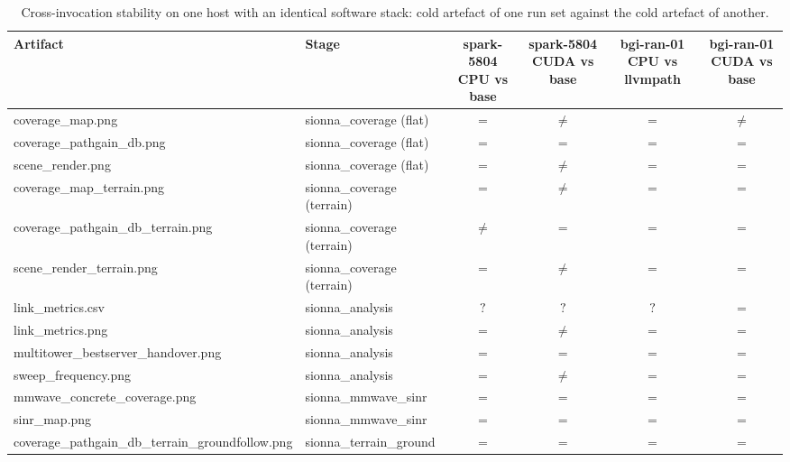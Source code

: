 \begin{table}[t]
  \centering
  \caption{Cross-invocation stability on one host with an identical software stack: cold artefact of one run set against the cold artefact of another.}
  \label{tab:replication}
  \begin{tabular}{llcccc}
    \toprule
    Artifact & Stage & spark-5804 CPU vs base & spark-5804 CUDA vs base & bgi-ran-01 CPU vs llvmpath & bgi-ran-01 CUDA vs base \\
    \midrule
    coverage\_map.png & sionna\_coverage (flat) & $=$ & $\neq$ & $=$ & $\neq$ \\
    coverage\_pathgain\_db.png & sionna\_coverage (flat) & $=$ & $=$ & $=$ & $=$ \\
    scene\_render.png & sionna\_coverage (flat) & $=$ & $\neq$ & $=$ & $=$ \\
    coverage\_map\_terrain.png & sionna\_coverage (terrain) & $=$ & $\neq$ & $=$ & $=$ \\
    coverage\_pathgain\_db\_terrain.png & sionna\_coverage (terrain) & $\neq$ & $=$ & $=$ & $=$ \\
    scene\_render\_terrain.png & sionna\_coverage (terrain) & $=$ & $\neq$ & $=$ & $=$ \\
    link\_metrics.csv & sionna\_analysis & $?$ & $?$ & $?$ & $=$ \\
    link\_metrics.png & sionna\_analysis & $=$ & $\neq$ & $=$ & $=$ \\
    multitower\_bestserver\_handover.png & sionna\_analysis & $=$ & $=$ & $=$ & $=$ \\
    sweep\_frequency.png & sionna\_analysis & $=$ & $\neq$ & $=$ & $=$ \\
    mmwave\_concrete\_coverage.png & sionna\_mmwave\_sinr & $=$ & $=$ & $=$ & $=$ \\
    sinr\_map.png & sionna\_mmwave\_sinr & $=$ & $=$ & $=$ & $=$ \\
    coverage\_pathgain\_db\_terrain\_groundfollow.png & sionna\_terrain\_ground & $=$ & $=$ & $=$ & $=$ \\
    \bottomrule
  \end{tabular}
\end{table}
